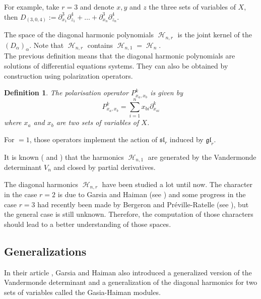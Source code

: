 \documentclass[letter,12pt]{article}
\newcommand{\pauline}[1]{\todo[linecolor=blue,backgroundcolor=blue!25,bordercolor=blue]{#1}}
\DeclareMathOperator{\harmonics}{\mathcal{H}}
\newtheorem{definition}{Definition}
\begin{document}
	For example, take $r=3$ and denote $x, y$ and $z$ the three sets of variables of $X$, then $D_{(3,0,4)} := \partial_{x_1}^3\partial_{z_1}^4 + \dots + \partial_{x_n}^3\partial_{z_n}^4$. 
	
	The space of the diagonal harmonic polynomials $\harmonics_{n,r}$ is the joint kernel of the $(D_\alpha)_\alpha$. Note that $\harmonics_{n,r}$ contains $\harmonics_{n,1} = \harmonics_{n}$.\\
	
	The previous definition means that the diagonal harmonic polynomials are solutions of differential equations systems. 
	They can also be obtained by construction using polarization operators. 
	
	\begin{definition} \pauline{define polarization now or later ?}
		The \emph{polarisation operator} $P_{x_a,x_b}^k$ is given by
		$$P_{x_a,x_b}^k = \sum_{i=1}^{n} x_{bi} \partial_{x_{ai}}^k$$
		where $x_a$ and $x_b$ are two sets of variables of $X$. 
	\end{definition}
	
	For $=1$, those operators implement the action of $\mathfrak{sl}_r$ induced by $\mathfrak{gl}_r$.
	
	It is known (\cite{Haiman2002} and \cite{Bergeron2009}) that the harmonics $\harmonics_{n,1}$ are generated by the Vandermonde determinant $V_n$ and closed by partial derivatives. 
	
	The diagonal harmonics $\harmonics_{n,r}$ have been studied a lot until now. The character in the case $r=2$ is due to Garsia and Haiman (see \cite{GarsiaHaiman1993}) and some progress in the case $r=3$ had recently been made by Bergeron and Préville-Ratelle (see \cite{BergeronPreville2012}), but the general case is still unknown. Therefore, the computation of those characters should lead to a better understanding of those spaces. 
	
	\subsection{Generalizations}
	
	In their article \cite{GarsiaHaiman1993}, Garsia and Haiman also introduced a generalized version of the Vandermonde determinant and a generalization of the diagonal harmonics for two sets of variables called the Gasia-Haiman modules. \\
	
\end{document}

